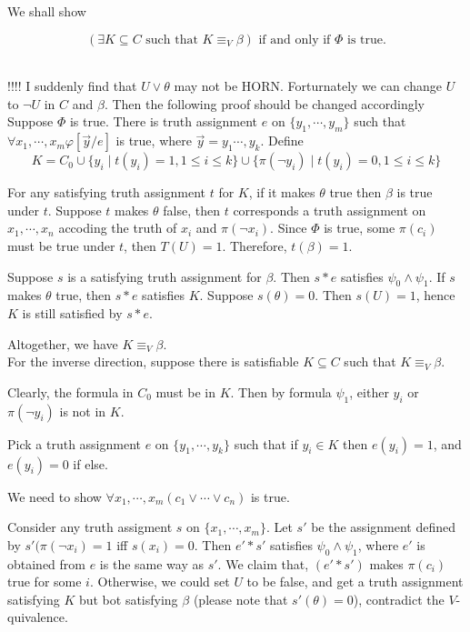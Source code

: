\documentclass[12pt]{article}
\begin{document}
{We shall show 

$$(\exists K\subseteq C \text{ such that } K\equiv_V \beta) \text{ if and only if $\Phi$ is true}.$$

\ \\

\color{red} 
!!!! I suddenly find that $U\vee \theta $ may not be HORN. Forturnately we can change $U$ to $\neg U$ in $C$ and $\beta$. Then the following proof should be changed accordingly 
\color{black}\\

Suppose $\Phi$ is true. There is truth assignment
$e$ on $\{y_1,\cdots, y_m\}$ such that $\forall x_1,\cdots,x_m\varphi[\vec{y}/e]$ is true, where $\vec{y}=y_1\cdots,y_k$. Define 
%
$$K=C_0\cup \{y_i\mid t(y_i)=1, 1\leq i\leq k\}\cup \{\pi(\neg y_i)\mid t(y_i)=0, 1\leq i\leq k\}$$

For any satisfying truth assignment $t$ for $K$, if it makes $\theta$ true then $\beta$ is true under $t$. Suppose $t$ makes $\theta$ false, then $t$ corresponds a truth assignment on $x_1,\cdots, x_n$ accoding the truth of $x_i$ and $\pi(\neg x_i)$. Since $\Phi$ is true, some  $\pi(c_i)$ must be true under $t$, then $T(U)=1$. Therefore, $t(\beta)=1$.

Suppose $s$ is a satisfying truth assignment for $\beta$. Then $s*e$ satisfies $\psi_0\wedge \psi_1$. If $s$ makes $\theta$ true, then $s*e$ satisfies $K$. Suppose $s(\theta)=0$. Then $s(U)=1$, hence $K$ is still satisfied by $s*e$. 

Altogether, we have $K\equiv_V\beta$.\\


For the inverse direction, suppose there is satisfiable $K\subseteq C$ such that $K\equiv_V\beta$. 


Clearly, the formula in $C_0$ must be in $K$. Then by formula $\psi_1$, either $y_i$ or  $\pi(\neg y_i)$ is not in $K$. 

Pick a truth assignment $e$ on $\{y_1,\cdots, y_k\}$ such that if $y_i\in K$ then $e(y_i)=1$, and $e(y_i)=0$  if else. 

We need to show $\forall x_1,\cdots,x_m(c_1\vee\cdots\vee c_n)$ is true.

Consider any truth assigment $s$ on $\{x_1,\cdots, x_m\}$. Let $s'$ be the assignment defined by $s'(\pi(\neg x_i)=1$ iff $s(x_i)=0$. Then $e'*s'$ satisfies $\psi_0\wedge\psi_1$, where $e'$ is obtained from $e$ is the same way as $s'$. 
We claim that, $(e'*s')$ makes $\pi(c_i)$ true for some $i$. Otherwise, we could set $U$ to be false,  and get a truth assignment satisfying $K$ but bot satisfying $\beta$ (please note that $s'(\theta)=0$), contradict the $V$-quivalence. 

}
\end{document}
